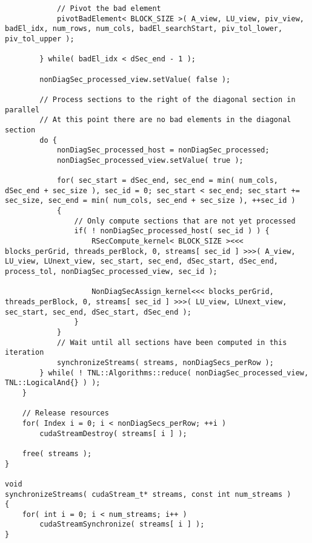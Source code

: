 \begin{lstlisting}
			// Pivot the bad element
			pivotBadElement< BLOCK_SIZE >( A_view, LU_view, piv_view, badEl_idx, num_rows, num_cols, badEl_searchStart, piv_tol_lower, piv_tol_upper );
			
		} while( badEl_idx < dSec_end - 1 );
		
		nonDiagSec_processed_view.setValue( false );
		
		// Process sections to the right of the diagonal section in parallel
		// At this point there are no bad elements in the diagonal section
		do {
			nonDiagSec_processed_host = nonDiagSec_processed;
			nonDiagSec_processed_view.setValue( true );
			
			for( sec_start = dSec_end, sec_end = min( num_cols, dSec_end + sec_size ), sec_id = 0; sec_start < sec_end; sec_start += sec_size, sec_end = min( num_cols, sec_end + sec_size ), ++sec_id )
			{
				// Only compute sections that are not yet processed
				if( ! nonDiagSec_processed_host( sec_id ) ) {
					RSecCompute_kernel< BLOCK_SIZE ><<< blocks_perGrid, threads_perBlock, 0, streams[ sec_id ] >>>( A_view, LU_view, LUnext_view, sec_start, sec_end, dSec_start, dSec_end, process_tol, nonDiagSec_processed_view, sec_id );
					
					NonDiagSecAssign_kernel<<< blocks_perGrid, threads_perBlock, 0, streams[ sec_id ] >>>( LU_view, LUnext_view, sec_start, sec_end, dSec_start, dSec_end );
				}
			}
			// Wait until all sections have been computed in this iteration
			synchronizeStreams( streams, nonDiagSecs_perRow );
		} while( ! TNL::Algorithms::reduce( nonDiagSec_processed_view, TNL::LogicalAnd{} ) );
	}
	
	// Release resources
	for( Index i = 0; i < nonDiagSecs_perRow; ++i )
		cudaStreamDestroy( streams[ i ] );
	
	free( streams );
}

void
synchronizeStreams( cudaStream_t* streams, const int num_streams )
{
	for( int i = 0; i < num_streams; i++ )
		cudaStreamSynchronize( streams[ i ] );
}
\end{lstlisting}

